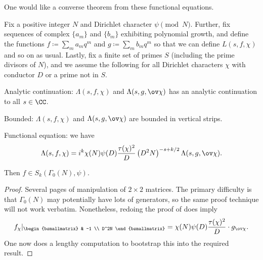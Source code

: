 \documentclass{article}
\begin{document}
One would like a converse theorem from these functional equations.
\begin{theorem}[Weil]
	Fix a positive integer $N$ and Dirichlet character $\psi\pmod N$. Further, fix sequences of complex $\{a_m\}$ and $\{b_m\}$ exhibiting polynomial growth, and define the functions $f\coloneqq\sum_{m}a_mq^m$ and $g\coloneqq\sum_mb_mq^m$ so that we can define $L(s,f,\chi)$ and so on as usual. Lastly, fix a finite set of primes $S$ (including the prime divisors of $N$), and we assume the following for all Dirichlet characters $\chi$ with conductor $D$ or a prime not in $S$.
	\begin{listalph}
		\item Analytic continuation: $\Lambda(s,f,\chi)$ and $\Lambda(s,g,\ov\chi)$ has an analytic continuation to all $s\in\CC$.
		\item Bounded: $\Lambda(s,f,\chi)$ and $\Lambda(s,g,\ov\chi)$ are bounded in vertical strips.
		\item Functional equation: we have
		\[\Lambda(s,f,\chi)=i^k\chi(N)\psi(D)\frac{\tau(\chi)^2}D\left(D^2N\right)^{-s+k/2}\Lambda(s,g,\ov\chi).\]
	\end{listalph}
	Then $f\in S_k(\Gamma_0(N),\psi)$.
\end{theorem}
\begin{proof}
	Several pages of manipulation of $2\times2$ matrices. The primary difficulty is that $\Gamma_0(N)$ may potentially have lots of generators, so the same proof technique will not work verbatim. Nonetheless, redoing the proof of  does imply
	\[f_\chi|_{\begin{bsmallmatrix}
		& -1 \\ D^2N
	\end{bsmallmatrix}}=\chi(N)\psi(D)\frac{\tau(\chi)^2}D\cdot g_{\ov\chi}.\]
	One now does a lengthy computation to bootstrap this into the required result.
\end{proof}

\end{document}
